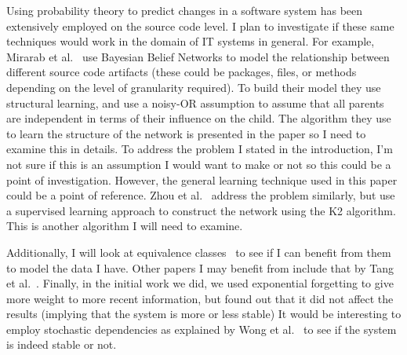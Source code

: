 \documentclass{article}
\begin{document}
Using probability theory to predict changes in a software system has been extensively employed on the source code level. I plan to investigate if these
same techniques would work in the domain of IT systems in general. For example, Mirarab et al.~\cite{mirarab2007} use Bayesian Belief Networks to model the
relationship between different source code artifacts (these could be packages, files, or methods depending on the level of granularity required). To build
their model they use structural learning, and use a noisy-OR assumption to assume that all parents are independent in terms of their influence on the child.
The algorithm they use to learn the structure of the network is presented in the paper so I need to examine this in details. To address the problem I stated in
the introduction, I'm not sure if this is an assumption I would want to make or not so this could be a point of investigation. However, the general learning
technique used in this paper could be a point of reference. Zhou et al.~\cite{zhou2008} address the problem similarly, but use a supervised learning approach to
construct the network using the K2 algorithm. This is another algorithm I will need to examine. 

Additionally, I will look at equivalence classes~\cite{friedman2000using} to see if I can benefit from them to model the data I have. Other papers I may
benefit from include that by Tang et al.~\cite{tang2007using}. Finally, in the initial work we did, we used exponential forgetting to give more weight to more
recent information, but found out that it did not affect the results (implying that the system is more or less stable) It would be interesting to employ
stochastic dependencies as explained by Wong et al.~\cite{wong-change} to see if the system is indeed stable or not.

 


 
\end{document}
